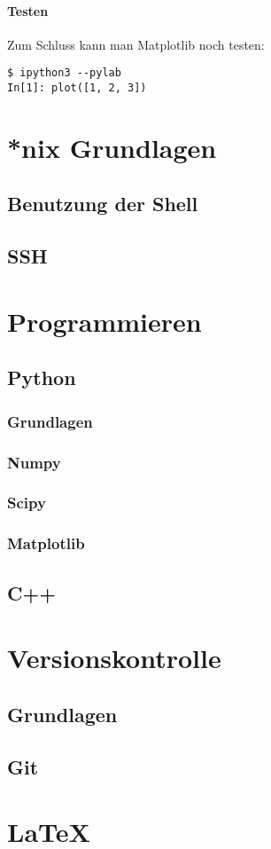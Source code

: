 \documentclass[a4paper,11pt,oneside]{scrbook}
\begin{document}
\subsubsection{Testen}

Zum Schluss kann man Matplotlib noch testen:

\begin{verbatim}
$ ipython3 --pylab
In[1]: plot([1, 2, 3])
\end{verbatim}

\chapter{*nix Grundlagen}
\section{Benutzung der Shell}
\section{SSH}


\chapter{Programmieren}
\section{Python}
\subsection{Grundlagen}
\subsection{Numpy}
\subsection{Scipy}
\subsection{Matplotlib}
\section{C++}


\chapter{Versionskontrolle}
\section{Grundlagen}
\section{Git}


\chapter{LaTeX}
\end{document}
